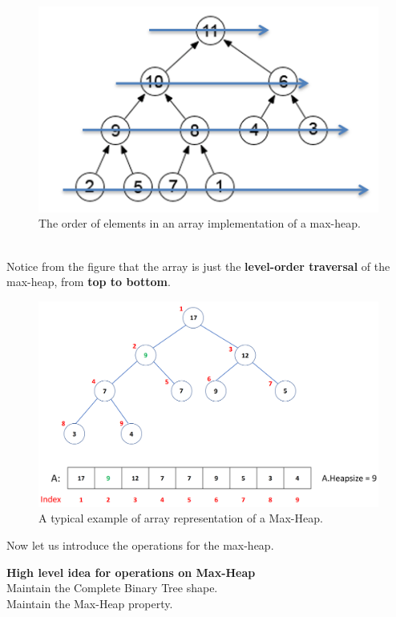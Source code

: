 \documentclass{article}
\begin{document}
\begin{figure}[h]\begin{center}\includegraphics[scale=0.55]{image006.png}\end{center}\caption{The order of elements in an array implementation of a max-heap.}
\end{figure}
\\
Notice from the figure that the array is just the \textbf{level-order traversal} of the max-heap, from \textbf{top \textbf{to bottom}}.
\begin{figure}[h]\begin{center}\includegraphics[scale=0.6]{image007.png}\end{center}\caption{A typical example of array representation of a Max-Heap.}\end{figure}
Now let us introduce the operations for the max-heap. \\
\begin{framed}
\textbf{High level idea for operations on Max-Heap}\\
\indent \textbullet  \indent Maintain the Complete Binary Tree shape.\\
\indent \textbullet \indent Maintain the Max-Heap property. 
\end{framed}
\end{document}
